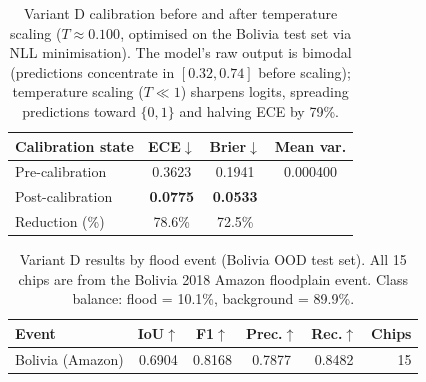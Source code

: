 %
%
\begin{table}[t]
\centering
\caption{%
  Variant D calibration before and after temperature scaling
  ($T \approx 0.100$, optimised on the Bolivia test set via NLL minimisation).
  The model's raw output is bimodal (predictions concentrate in $[0.32, 0.74]$
  before scaling); temperature scaling ($T \ll 1$) sharpens logits,
  spreading predictions toward $\{0,1\}$ and halving ECE by 79\%.
}
\label{tab:calibration}
\begin{tabular}{@{}l S[table-format=1.4] S[table-format=1.4] S[table-format=1.6]@{}}
\toprule
Calibration state & {ECE$\downarrow$} & {Brier$\downarrow$} & {Mean var.} \\
\midrule
Pre-calibration   & 0.3623 & 0.1941 & 0.000400 \\
Post-calibration  & \bfseries 0.0775 & \bfseries 0.0533 &  \\
\midrule
Reduction (\%)    & 78.6\% & 72.5\% & \\
\bottomrule
\end{tabular}
\end{table}


%
%
\begin{table}[t]
\centering
\caption{%
  Variant D results by flood event (Bolivia OOD test set).
  All 15 chips are from the Bolivia 2018 Amazon floodplain event.
  Class balance: flood = 10.1\%, background = 89.9\%.
}
\label{tab:per_event}
\begin{tabular}{@{}l S[table-format=1.4] S[table-format=1.4] S[table-format=1.4] S[table-format=1.4] r@{}}
\toprule
Event & {IoU$\uparrow$} & {F1$\uparrow$} & {Prec.$\uparrow$} & {Rec.$\uparrow$} & Chips \\
\midrule
Bolivia (Amazon) & 0.6904 & 0.8168 & 0.7877 & 0.8482 & 15 \\
\bottomrule
\end{tabular}
\end{table}


